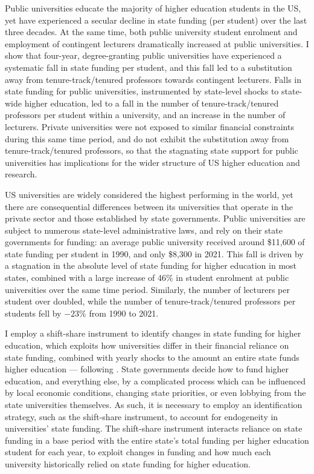 Public universities educate the majority of higher education students in the US, yet have experienced a secular decline in state funding (per student) over the last three decades.
At the same time, both public university student enrolment and employment of contingent lecturers dramatically increased at public universities.
I show that four-year, degree-granting public universities have experienced a systematic fall in state funding per student, and this fall led to a substitution away from tenure-track/tenured professors towards contingent lecturers.
Falls in state funding for public universities, instrumented by state-level shocks to state-wide higher education, led to a fall in the number of tenure-track/tenured professors per student within a university, and an increase in the number of lecturers.
Private universities were not exposed to similar financial constraints during this same time period, and do not exhibit the substitution away from tenure-track/tenured professors, so that the stagnating state support for public universities has implications for the wider structure of US higher education and research.

US universities are widely considered the highest performing in the world, yet there are consequential differences between its universities that operate in the private sector and those established by state governments.
Public universities are subject to numerous state-level administrative laws, and rely on their state governments for funding: an average public university received around \$11,600 of state funding per student in 1990, and only \$8,300 in 2021.
This fall is driven by a stagnation in the absolute level of state funding for higher education in most states, combined with a large increase of 46\% in student enrolment at public universities over the same time period.
Similarly, the number of lecturers per student over doubled, while the number of tenure-track/tenured professors per students fell by $-23$\% from 1990 to 2021.

I employ a shift-share instrument to identify changes in state funding for higher education, which exploits how universities differ in their financial reliance on state funding, combined with yearly shocks to the amount an entire state funds higher education --- following \cite{NBERw23736,NBERw27885}.
State governments decide how to fund higher education, and everything else, by a complicated process which can be influenced by local economic conditions, changing state priorities, or even lobbying from the state universities themselves.
As such, it is necessary to employ an identification strategy, such as the shift-share instrument, to account for endogeneity in universities' state funding.
The shift-share instrument interacts reliance on state funding in a base period with the entire state's total funding per higher education student for each year, to exploit changes in funding and how much each university historically relied on state funding for higher education.

